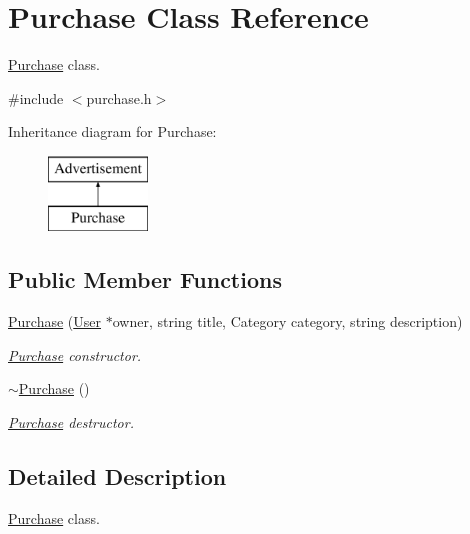 \hypertarget{class_purchase}{}\section{Purchase Class Reference}
\label{class_purchase}


\hyperlink{class_purchase}{Purchase} class.  




{\ttfamily \#include $<$purchase.\+h$>$}

Inheritance diagram for Purchase\+:\begin{figure}[H]
\begin{center}
\leavevmode
\includegraphics[height=2.000000cm]{class_purchase}
\end{center}
\end{figure}
\subsection*{Public Member Functions}
\begin{DoxyCompactItemize}
\item 
\hyperlink{class_purchase_a5603b3428060205ce26e45441f37d560}{Purchase} (\hyperlink{class_user}{User} $\ast$owner, string title, Category category, string description)
\begin{DoxyCompactList}\small\item\em \hyperlink{class_purchase}{Purchase} constructor. \end{DoxyCompactList}\item 
\hypertarget{class_purchase_a8ebd6efb2177df6d10fcba514095915f}{}\hyperlink{class_purchase_a8ebd6efb2177df6d10fcba514095915f}{$\sim$\+Purchase} ()\label{class_purchase_a8ebd6efb2177df6d10fcba514095915f}

\begin{DoxyCompactList}\small\item\em \hyperlink{class_purchase}{Purchase} destructor. \end{DoxyCompactList}\end{DoxyCompactItemize}


\subsection{Detailed Description}
\hyperlink{class_purchase}{Purchase} class. 


